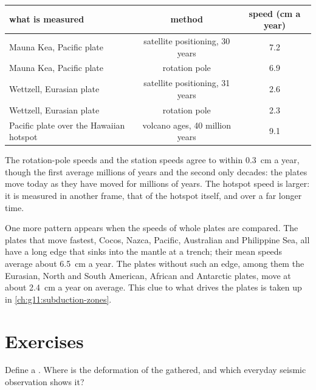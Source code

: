 \begin{center}
\small
\begin{tabular}{|l|c|c|}
\hline
what is measured & method & speed (\unit{cm} a year) \\ \hline
Mauna Kea, Pacific plate & satellite positioning, 30 years & 7.2 \\
Mauna Kea, Pacific plate & rotation pole & 6.9 \\
Wettzell, Eurasian plate & satellite positioning, 31 years & 2.6 \\
Wettzell, Eurasian plate & rotation pole & 2.3 \\
Pacific plate over the Hawaiian hotspot & volcano ages, 40 million years & 9.1 \\ \hline
\end{tabular}
\end{center}

The rotation-pole speeds and the station speeds agree to within
\qty{0.3}{cm} a year, though the first average millions of years and the
second only decades: the plates move today as they have moved for millions of
years. The hotspot speed is larger: it is measured in another frame, that of
the hotspot itself, and over a far longer time.

One more pattern appears when the speeds of whole plates are compared. The
plates that move fastest, Cocos, Nazca, Pacific, Australian and Philippine
Sea, all have a long edge that sinks into the mantle at a trench; their mean
speeds average about \qty{6.5}{cm} a year. The plates without such
an edge, among them the Eurasian, North and South American, African and
Antarctic plates, move at about \qty{2.4}{cm} a year on average. This clue to
what drives the plates is taken up in \cref{ch:g11:subduction-zones}.

\section{Exercises}

\begin{exercise}[$\star$]\label{exo:g11:plate-motions:1}
Define a . Where is the deformation of the  gathered,
and which everyday seismic observation shows it?
\end{exercise}

